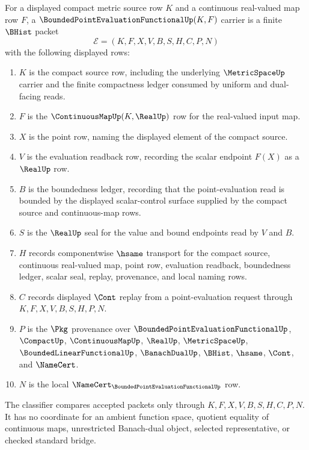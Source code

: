 \begin{definition}
\label{def:bounded-point-evaluation-functional-carrier}
For a displayed compact metric source row $K$ and a continuous real-valued map row $F$, a $\BoundedPointEvaluationFunctionalUp(K,F)$ carrier is a finite $\BHist$ packet
$$
\mathcal{E}=(K,F,X,V,B,S,H,C,P,N)
$$
with the following displayed rows:
\begin{enumerate}
\item $K$ is the compact source row, including the underlying $\MetricSpaceUp$ carrier and the finite compactness ledger consumed by uniform and dual-facing reads.
\item $F$ is the $\ContinuousMapUp(K,\RealUp)$ row for the real-valued input map.
\item $X$ is the point row, naming the displayed element of the compact source.
\item $V$ is the evaluation readback row, recording the scalar endpoint $F(X)$ as a $\RealUp$ row.
\item $B$ is the boundedness ledger, recording that the point-evaluation read is bounded by the displayed scalar-control surface supplied by the compact source and continuous-map rows.
\item $S$ is the $\RealUp$ seal for the value and bound endpoints read by $V$ and $B$.
\item $H$ records componentwise $\hsame$ transport for the compact source, continuous real-valued map, point row, evaluation readback, boundedness ledger, scalar seal, replay, provenance, and local naming rows.
\item $C$ records displayed $\Cont$ replay from a point-evaluation request through $K,F,X,V,B,S,H,P,N$.
\item $P$ is the $\Pkg$ provenance over $\BoundedPointEvaluationFunctionalUp$, $\CompactUp$, $\ContinuousMapUp$, $\RealUp$, $\MetricSpaceUp$, $\BoundedLinearFunctionalUp$, $\BanachDualUp$, $\BHist$, $\hsame$, $\Cont$, and $\NameCert$.
\item $N$ is the local $\NameCert_{\BoundedPointEvaluationFunctionalUp}$ row.
\end{enumerate}
The classifier compares accepted packets only through $K,F,X,V,B,S,H,C,P,N$. It has no coordinate for an ambient function space, quotient equality of continuous maps, unrestricted Banach-dual object, selected representative, or checked standard bridge.
\end{definition}

